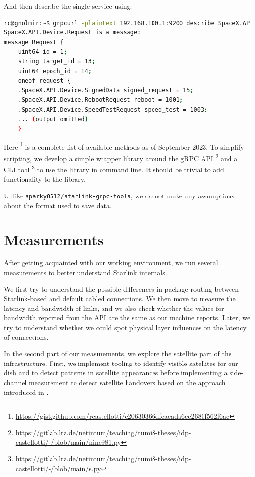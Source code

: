 \documentclass[IN,11pt,twoside,openright,idp,english]{tumthesis}
\begin{document}
And then describe the single service using:
    
\begin{lstlisting}[language=bash]
rc@gnolmir:~$ grpcurl -plaintext 192.168.100.1:9200 describe SpaceX.API.Device.Request
SpaceX.API.Device.Request is a message:
message Request {
    uint64 id = 1;
    string target_id = 13;
    uint64 epoch_id = 14;
    oneof request {
    .SpaceX.API.Device.SignedData signed_request = 15;
    .SpaceX.API.Device.RebootRequest reboot = 1001;
    .SpaceX.API.Device.SpeedTestRequest speed_test = 1003;
    ... (output omitted)
    }
\end{lstlisting}
    
Here \footnote{\url{https://gist.github.com/rcastellotti/e20630366dfeaeada6cc2680f562f6ac}} is a complete list of available methods as of September 2023.
To simplify scripting, we develop a simple wrapper library around the gRPC API  \footnote{\url{https://gitlab.lrz.de/netintum/teaching/tumi8-theses/idp-castellotti/-/blob/main/nine981.py}} and a CLI tool \footnote{\url{https://gitlab.lrz.de/netintum/teaching/tumi8-theses/idp-castellotti/-/blob/main/s.py}} to use the library in command line. It should be trivial to add functionality to the library.

Unlike \texttt{sparky8512/starlink-grpc-tools}, we do not make any assumptions about the format used to save data.
    
\chapter{Measurements}

After getting acquainted with our working environment, we run several measurements to better understand Starlink internals. 
    
We first try to understand the possible differences in package routing between Starlink-based and default cabled connections. We then move to measure the latency and bandwidth of links, and we also check whether the values for bandwidth reported from the API are the same as our machine reports. Later, we try to understand whether we could spot physical layer influences on the latency of connections.  
    
In the second part of our measurements, we explore the satellite part of the infrastructure. First, we implement tooling to identify visible satellites for our dish and to detect patterns in satellite appearances before implementing a side-channel measurement to detect satellite handovers based on the approach introduced in \cite{izhikevich2023democratizing}.
    
\end{document}
